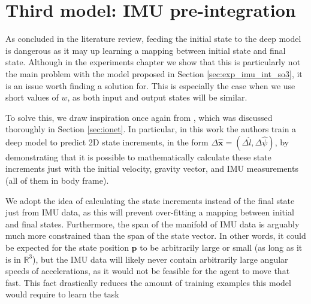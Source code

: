 \section{Third model: IMU pre-integration}\label{sec:pre_int_training}

As concluded in the literature review, feeding the initial state to the deep model is dangerous as it may up learning a mapping between initial state and final state.
Although in the experiments chapter we show that this is particularly not the main problem with the model proposed in Section \ref{sec:exp_imu_int_so3}, it is an issue worth finding a solution for.
This is especially the case when we use short values of $w$, as both input and output states will be similar.

To solve this, we draw inspiration once again from \cite{DBLP:journals/corr/abs-1802-02209}, which was discussed thoroughly in Section \ref{sec:ionet}.
In particular, in this work the authors train a deep model to predict 2D state increments, in the form $\Delta\mathbf{\hat{x}}=(\Delta\hat{l}, \Delta\hat{\psi})$, by demonstrating that it is possible to mathematically calculate these state increments just with the initial velocity, gravity vector, and IMU measurements (all of them in body frame).

We adopt the idea of calculating the state increments instead of the final state just from IMU data, as this will prevent over-fitting a mapping between initial and final states.
Furthermore, the span of the manifold of IMU data is arguably much more constrained than the span of the state vector.
In other words, it could be expected for the state position $\mathbf{p}$ to be arbitrarily large or small (as long as it is in $\mathbb{R}^3$), but the IMU data will likely never contain arbitrarily large angular speeds of accelerations, as it would not be feasible for the agent to move that fast.
This fact drastically reduces the amount of training examples this model would require to learn the task

